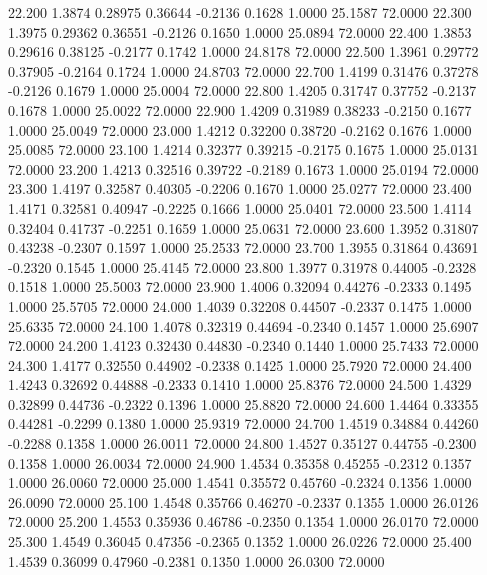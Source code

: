   22.200   1.3874   0.28975   0.36644  -0.2136   0.1628   1.0000  25.1587  72.0000
  22.300   1.3975   0.29362   0.36551  -0.2126   0.1650   1.0000  25.0894  72.0000
  22.400   1.3853   0.29616   0.38125  -0.2177   0.1742   1.0000  24.8178  72.0000
  22.500   1.3961   0.29772   0.37905  -0.2164   0.1724   1.0000  24.8703  72.0000
  22.700   1.4199   0.31476   0.37278  -0.2126   0.1679   1.0000  25.0004  72.0000
  22.800   1.4205   0.31747   0.37752  -0.2137   0.1678   1.0000  25.0022  72.0000
  22.900   1.4209   0.31989   0.38233  -0.2150   0.1677   1.0000  25.0049  72.0000
  23.000   1.4212   0.32200   0.38720  -0.2162   0.1676   1.0000  25.0085  72.0000
  23.100   1.4214   0.32377   0.39215  -0.2175   0.1675   1.0000  25.0131  72.0000
  23.200   1.4213   0.32516   0.39722  -0.2189   0.1673   1.0000  25.0194  72.0000
  23.300   1.4197   0.32587   0.40305  -0.2206   0.1670   1.0000  25.0277  72.0000
  23.400   1.4171   0.32581   0.40947  -0.2225   0.1666   1.0000  25.0401  72.0000
  23.500   1.4114   0.32404   0.41737  -0.2251   0.1659   1.0000  25.0631  72.0000
  23.600   1.3952   0.31807   0.43238  -0.2307   0.1597   1.0000  25.2533  72.0000
  23.700   1.3955   0.31864   0.43691  -0.2320   0.1545   1.0000  25.4145  72.0000
  23.800   1.3977   0.31978   0.44005  -0.2328   0.1518   1.0000  25.5003  72.0000
  23.900   1.4006   0.32094   0.44276  -0.2333   0.1495   1.0000  25.5705  72.0000
  24.000   1.4039   0.32208   0.44507  -0.2337   0.1475   1.0000  25.6335  72.0000
  24.100   1.4078   0.32319   0.44694  -0.2340   0.1457   1.0000  25.6907  72.0000
  24.200   1.4123   0.32430   0.44830  -0.2340   0.1440   1.0000  25.7433  72.0000
  24.300   1.4177   0.32550   0.44902  -0.2338   0.1425   1.0000  25.7920  72.0000
  24.400   1.4243   0.32692   0.44888  -0.2333   0.1410   1.0000  25.8376  72.0000
  24.500   1.4329   0.32899   0.44736  -0.2322   0.1396   1.0000  25.8820  72.0000
  24.600   1.4464   0.33355   0.44281  -0.2299   0.1380   1.0000  25.9319  72.0000
  24.700   1.4519   0.34884   0.44260  -0.2288   0.1358   1.0000  26.0011  72.0000
  24.800   1.4527   0.35127   0.44755  -0.2300   0.1358   1.0000  26.0034  72.0000
  24.900   1.4534   0.35358   0.45255  -0.2312   0.1357   1.0000  26.0060  72.0000
  25.000   1.4541   0.35572   0.45760  -0.2324   0.1356   1.0000  26.0090  72.0000
  25.100   1.4548   0.35766   0.46270  -0.2337   0.1355   1.0000  26.0126  72.0000
  25.200   1.4553   0.35936   0.46786  -0.2350   0.1354   1.0000  26.0170  72.0000
  25.300   1.4549   0.36045   0.47356  -0.2365   0.1352   1.0000  26.0226  72.0000
  25.400   1.4539   0.36099   0.47960  -0.2381   0.1350   1.0000  26.0300  72.0000
